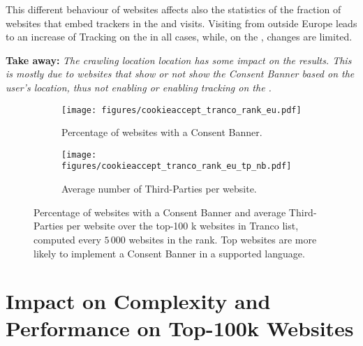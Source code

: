 This different behaviour of websites affects also the statistics of the fraction of websites that embed trackers in the \BEFORE and \AFTER visits. Visiting from outside Europe leads to an increase of Tracking on the \BEFORE in all cases, while, on the \AFTER, changes are limited.

\textbf{Take away:} 
\textit{The crawling location location has some impact on the results. This is mostly due to websites that show or not show the Consent Banner based on the user's location, thus not enabling or enabling tracking on the \BEFORE.}

\begin{figure}[!t]
    \centering
    \begin{subfigure}[t]{0.495\columnwidth}
        \texttt{[image: figures/cookieaccept\_tranco\_rank\_eu.pdf]}
        \caption{Percentage of websites with a Consent Banner.}
        \label{fig:tranco_rank}
    \end{subfigure}
    \begin{subfigure}[t]{0.495\columnwidth}
        \texttt{[image: figures/cookieaccept\_tranco\_rank\_eu\_tp\_nb.pdf]}
        \caption{Average number of Third-Parties per website.}
        \label{fig:tranco_tp}
    \end{subfigure}    
     \caption{Percentage of websites with a Consent Banner and average Third-Parties per website over the top-100 k websites in Tranco list, computed every $5\,000$ websites in the rank. Top websites are more likely to implement a Consent Banner in a \TOOL supported language.}
    \label{fig:tranco}   
\end{figure}

\section{Impact on Complexity and Performance on Top-100k Websites}
\label{sec:performance}

